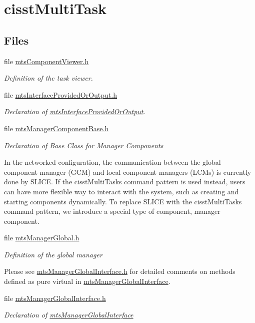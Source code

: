 \hypertarget{group__cisst_multi_task}{}\section{cisst\+Multi\+Task}
\label{group__cisst_multi_task}
\subsection*{Files}
\begin{DoxyCompactItemize}
\item 
file \hyperlink{mts_component_viewer_8h}{mts\+Component\+Viewer.\+h}
\begin{DoxyCompactList}\small\item\em Definition of the task viewer. \end{DoxyCompactList}\item 
file \hyperlink{mts_interface_provided_or_output_8h}{mts\+Interface\+Provided\+Or\+Output.\+h}
\begin{DoxyCompactList}\small\item\em Declaration of \hyperlink{classmts_interface_provided_or_output}{mts\+Interface\+Provided\+Or\+Output}. \end{DoxyCompactList}\item 
file \hyperlink{mts_manager_component_base_8h}{mts\+Manager\+Component\+Base.\+h}
\begin{DoxyCompactList}\small\item\em Declaration of Base Class for Manager Components

In the networked configuration, the communication between the global component manager (G\+C\+M) and local component managers (L\+C\+Ms) is currently done by S\+L\+I\+C\+E. If the cisst\+Multi\+Task\textquotesingle{}s command pattern is used instead, users can have more flexible way to interact with the system, such as creating and starting components dynamically. To replace S\+L\+I\+C\+E with the cisst\+Multi\+Task\textquotesingle{}s command pattern, we introduce a special type of component, manager component. \end{DoxyCompactList}\item 
file \hyperlink{mts_manager_global_8h}{mts\+Manager\+Global.\+h}
\begin{DoxyCompactList}\small\item\em Definition of the global manager

Please see \hyperlink{mts_manager_global_interface_8h}{mts\+Manager\+Global\+Interface.\+h} for detailed comments on methods defined as pure virtual in \hyperlink{classmts_manager_global_interface}{mts\+Manager\+Global\+Interface}. \end{DoxyCompactList}\item 
file \hyperlink{mts_manager_global_interface_8h}{mts\+Manager\+Global\+Interface.\+h}
\begin{DoxyCompactList}\small\item\em Declaration of \hyperlink{classmts_manager_global_interface}{mts\+Manager\+Global\+Interface}


\end{DoxyCompactList}
\end{DoxyCompactItemize}
